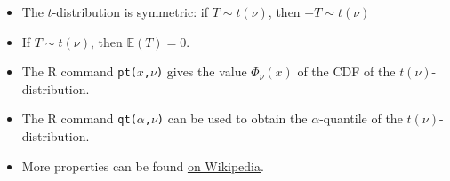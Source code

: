\documentclass[
  a4paper,
]{article}
\theoremstyle{definition}
\theoremstyle{definition}
\theoremstyle{definition}
\theoremstyle{definition}
\theoremstyle{remark}
\begin{document}
\begin{itemize}
\item
  The \(t\)-distribution is symmetric: if \(T \sim t(\nu)\), then
  \(-T \sim t(\nu)\)
\item
  If \(T\sim t(\nu)\), then \(\mathbb{E}(T) = 0\).
\item
  The R command \texttt{pt(\textbar{}}\(x\)\texttt{,}\(\nu\)\texttt{)} gives the value
  \(\Phi_\nu(x)\) of the CDF of the \(t(\nu)\)-distribution.
\item
  The R command \texttt{qt(}\(\alpha\)\texttt{,}\(\nu\)\texttt{)} can
  be used to obtain the
  \(\alpha\)-quantile of the \(t(\nu)\)-distribution.
\item
  More properties can be found
  \href{https://en.wikipedia.org/wiki/Student\%27s_t-distribution}{on Wikipedia}.
\end{itemize}

\clearpage
\end{document}
